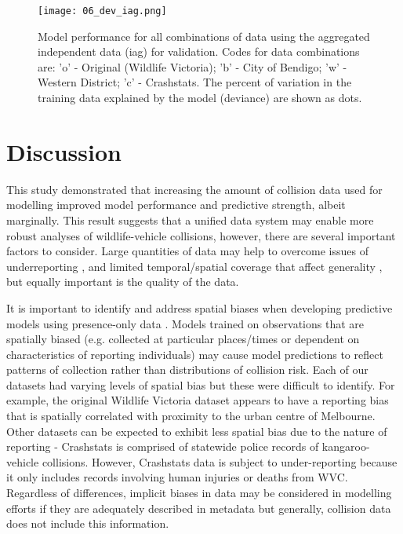\begin{figure*}[htp]
  \centering
  \texttt{[image: 06\_dev\_iag.png]}
  \caption[Model discrimination ability for all combinations of training data using the aggregated independent data for validation]{Model performance for all combinations of data using the aggregated independent data (iag) for validation. Codes for data combinations are: 'o' - Original (Wildlife Victoria); 'b' - City of Bendigo; 'w' - Western District; 'c' - Crashstats. The percent of variation in the training data explained by the model (deviance) are shown as dots.}
  \label{val_calib_dev}
\end{figure*}

\section{Discussion}

This study demonstrated that increasing the amount of collision data used for modelling improved model performance and predictive strength, albeit marginally. This result suggests that a unified data system may enable more robust analyses of wildlife-vehicle collisions, however, there are several important factors to consider. Large quantities of data may help to overcome issues of underreporting \citep{snow15}, and limited temporal/spatial coverage that affect generality \citep{clev15}, but equally important is the quality of the data.

It is important to identify and address spatial biases when developing predictive models using presence-only data \citep{kram13}. Models trained on observations that are spatially biased (e.g. collected at particular places/times or dependent on characteristics of reporting individuals) may cause model predictions to reflect patterns of collection rather than distributions of collision risk. Each of our datasets had varying levels of spatial bias but these were difficult to identify. For example, the original Wildlife Victoria dataset appears to have a reporting bias that is spatially correlated with proximity to the urban centre of Melbourne. Other datasets can be expected to exhibit less spatial bias due to the nature of reporting - Crashstats is comprised of statewide police records of kangaroo-vehicle collisions. However, Crashstats data is subject to under-reporting because it only includes records involving human injuries or deaths from WVC.  Regardless of differences, implicit biases in data may be considered in modelling efforts if they are adequately described in metadata \citep{wart13} but generally, collision data does not include this information.

